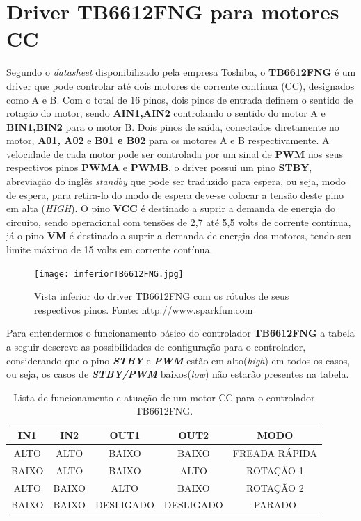 \documentclass[a4paper,12pt,portuguese]{ufms-cpcx}
\begin{document}
\section{Driver TB6612FNG para motores CC}\label{TB6612FNG}
Segundo o \textit{datasheet} disponibilizado pela empresa Toshiba, o \textbf{TB6612FNG} é um driver que pode controlar até dois motores de corrente contínua (CC), designados como A e B. Com o total de 16 pinos, dois pinos de entrada definem o sentido de rotação do motor, sendo \textbf{AIN1,AIN2} controlando o sentido do motor A e \textbf{BIN1,BIN2} para o motor B. Dois pinos de saída, conectados diretamente no motor, \textbf{A01, A02} e \textbf{B01 e B02} para os motores A e B respectivamente. A velocidade de cada motor pode ser controlada por um sinal de \textbf{PWM} nos seus respectivos pinos \textbf{PWMA} e \textbf{PWMB}, o driver possui um pino \textbf{STBY}, abreviação do inglês \textit{standby} que pode ser traduzido para espera, ou seja, modo de espera, para retira-lo do modo de espera deve-se colocar a tensão deste pino em alta (\textit{HIGH}). O pino \textbf{VCC} é destinado a suprir a demanda de energia do circuito, sendo operacional com tensões de 2,7 até 5,5 volts de corrente contínua, já o pino \textbf{VM} é destinado a suprir a demanda de energia dos motores, tendo seu limite máximo de 15 volts em corrente contínua. 

\begin{figure}[H]
	\centering
	\texttt{[image: inferiorTB6612FNG.jpg]}
	\caption{Vista inferior do driver TB6612FNG com os rótulos de seus respectivos pinos. Fonte: http://www.sparkfun.com}
\end{figure}

Para entendermos o funcionamento básico do controlador \textbf{TB6612FNG} a tabela a seguir descreve as possibilidades de configuração para o controlador, considerando que o pino \textit{\textbf{STBY}} e \textit{\textbf{PWM}} estão em alto(\textit{high}) em todos os casos, ou seja, os casos de \textit{\textbf{STBY/PWM}} baixos(\textit{low}) não estarão presentes na tabela.
\begin{table}[!h]
	\renewcommand{\arraystretch}{1.3}
	\centering
	\begin{tabular}{|c|c|c|c|c|}
		\hline
		\textbf{IN1} & \textbf{IN2} & \textbf{OUT1} & \textbf{OUT2} & \textbf{MODO} \\ \hline
		    ALTO     &     ALTO     &     BAIXO     &     BAIXO     & FREADA RÁPIDA \\ \hline
		   BAIXO     &     ALTO     &     BAIXO     &     ALTO      &   ROTAÇÃO 1   \\ \hline
		    ALTO     &    BAIXO     &     ALTO      &     BAIXO     &   ROTAÇÃO 2   \\ \hline
		   BAIXO     &    BAIXO     &   DESLIGADO   &   DESLIGADO   &    PARADO     \\ \hline
	\end{tabular}
	\caption[Tabela verdade controle motor]{Lista de funcionamento e atuação de um motor CC para o controlador TB6612FNG.}
	\label{Tab:TB6612FNG}
\end{table}
\end{document}
